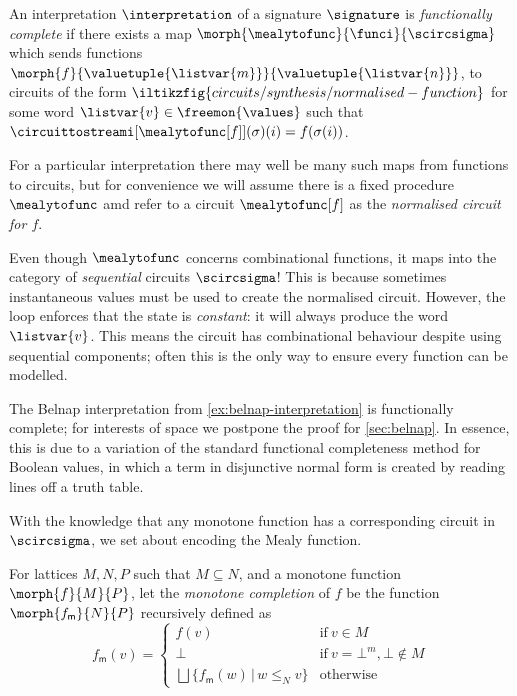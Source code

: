 \begin{definition}
    An interpretation \(\interpretation\) of a signature \(\signature\) is
    \emph{functionally complete} if there exists a map \(
        \morph{\mealytofunc}{\funci}{\scircsigma}
    \) which sends functions \(
        \morph{f}{\valuetuple{\listvar{m}}}{\valuetuple{\listvar{n}}}
    \), to circuits of the form \(
        \iltikzfig{circuits/synthesis/normalised-function}
    \) for some word \(\listvar{v} \in \freemon{\values}\) such that
    \(\circuittostreami[\mealytofunc[f]](\sigma)(i) = f(\sigma(i))\).
\end{definition}

For a particular interpretation there may well be many such maps from functions
to circuits, but for convenience we will assume there is a fixed procedure
\(\mealytofunc\) amd refer to a circuit \(\mealytofunc[f]\) as the
\emph{normalised circuit for \(f\)}.\

\begin{remark}
    Even though \(\mealytofunc\) concerns combinational functions, it maps into
    the category of \emph{sequential} circuits \(\scircsigma\)!
    This is because sometimes instantaneous values must be used to create the
    normalised circuit.
    However, the loop enforces that the state is \emph{constant}: it will always
    produce the word \(\listvar{v}\).
    This means the circuit has combinational behaviour despite using sequential
    components; often this is the only way to ensure every function can be
    modelled.
\end{remark}

\begin{example}
    The Belnap interpretation from \cref{ex:belnap-interpretation} is
    functionally complete; for interests of space we postpone the proof for
    \cref{sec:belnap}.
    In essence, this is due to a variation of the standard functional
    completeness method for Boolean values, in which a term in disjunctive
    normal form is created by reading lines off a truth table.
\end{example}

With the knowledge that any monotone function has a corresponding circuit
in \(\scircsigma\), we set about encoding the Mealy function.

\begin{definition}
    For lattices \(M, N, P\) such that \(M \subseteq N\), and a monotone
    function \(\morph{f}{M}{P}\), let the \emph{monotone completion} of \(f\) be
    the function \(\morph{f_\mathsf{m}}{N}{P}\) recursively defined as \[
        f_\mathsf{m}(v) = \begin{cases}
            f(v)
            &
            \text{if}\ v \in M
            \\
            \bot
            &
            \text{if}\ v = \bot^m, \bot \not\in M
            \\
            \bigsqcup \{ f_\mathsf{m}(w) \,|\, w \leq_N v \}
            &
            \text{otherwise}
        \end{cases}
    \]
\end{definition}

